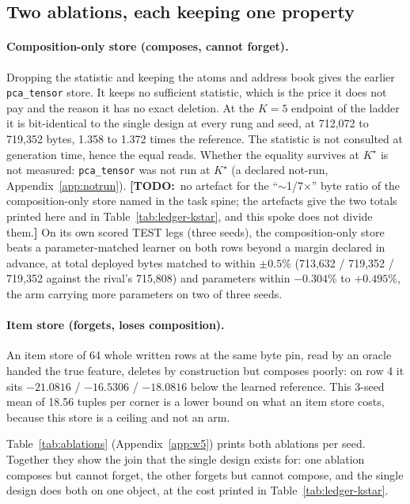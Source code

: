 \documentclass{article} %
\newcommand{\TODO}[1]{{\color{orange}\textbf{[TODO:}~#1\textbf{]}}}
\newcommand{\Kstar}{\ensuremath{K^{\star}}}
\begin{document}
\subsection{Two ablations, each keeping one property}
\label{sec:ablations}

\paragraph{Composition-only store (composes, cannot forget).} Dropping the statistic and keeping the atoms and address book gives the earlier \texttt{pca\_tensor} store. It keeps no
sufficient statistic, which is the price it does not pay and the reason it has no exact
deletion. At the $K=5$ endpoint of the ladder it is bit-identical to the single design at every rung and seed, at 712,072 to 719,352 bytes, 1.358 to 1.372 times the reference.
The statistic is not consulted at generation time, hence the equal reads. Whether the
equality survives at $\Kstar$ is not measured: \texttt{pca\_tensor} was not run at
$\Kstar$ (a declared not-run, Appendix~\ref{app:notrun}). \TODO{no artefact for the
``$\sim$1/7$\times$'' byte ratio of the composition-only store named in the task spine; the
artefacts give the two totals printed here and in Table~\ref{tab:ledger-kstar}, and this spoke
does not divide them.}
On its own scored TEST legs (three seeds), the composition-only store beats a parameter-matched
learner on both rows beyond a margin declared in advance, at total deployed bytes matched to within $\pm0.5$\% (713,632 / 719,352 / 719,352 against the rival's 715,808) and parameters within $-0.304$\% to $+0.495$\%, the arm carrying more parameters on two of three seeds.

\paragraph{Item store (forgets, loses composition).} An item store of 64 whole written rows at
the same byte pin, read by an oracle handed the true feature, deletes by construction but
composes poorly: on row 4 it sits $-21.0816$ / $-16.5306$ / $-18.0816$ below the learned
reference. This 3-seed mean of 18.56 tuples per corner is a lower bound on what an item store
costs, because this store is a ceiling and not an arm. %

Table~\ref{tab:ablations} (Appendix~\ref{app:w5}) prints both ablations per seed. Together they
show the join that the single design exists for: one ablation composes but cannot forget, the
other forgets but cannot compose, and the single design does both on one object, at the cost
printed in Table~\ref{tab:ledger-kstar}.
\end{document}
